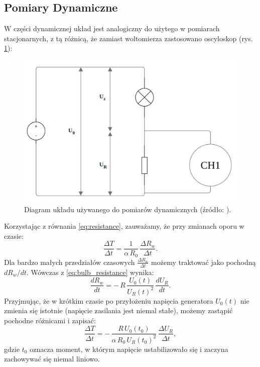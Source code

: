 \documentclass[12pt]{article}
\begin{document}
\newpage

\subsection{Pomiary Dynamiczne}
W części dynamicznej układ jest analogiczny do użytego w pomiarach stacjonarnych, z tą różnicą, że zamiast woltomierza zastosowano oscyloskop (rys. \ref{fig:pomiar_dyn}):
\begin{figure}[H]
    \centering
    \includegraphics[scale=0.25]{dynamic}
    \caption{Diagram układu używanego do pomiarów dynamicznych (źródło: \cite{diagram}).}
    \label{fig:pomiar_dyn}
\end{figure}

Korzystając z równania \eqref{eq:resistance}, zauważamy, że przy zmianach oporu w czasie:
\begin{equation}
    \frac{\Delta T}{\Delta t} = \frac{1}{\alpha\,R_0}\,\frac{\Delta R_w}{\Delta t}.
    \label{eq:temp_der}
\end{equation}
Dla bardzo małych przedziałów czasowych $\frac{\Delta R_w}{\Delta t}$ możemy traktować jako pochodną $d R_w / d t$. Wówczas z \eqref{eq:bulb_resistance} wynika:
\begin{equation}
    \frac{d R_w}{d t} = -\,R\,\frac{U_0(t)}{U_R(t)^2}\,\frac{d U_R}{dt}.
    \label{eq:bulb_der}
\end{equation}
Przyjmując, że w krótkim czasie po przyłożeniu napięcia generatora $U_0(t)$ nie zmienia się istotnie (napięcie zasilania jest niemal stałe), możemy zastąpić pochodne różnicami i zapisać:
\begin{equation}
    \frac{\Delta T}{\Delta t} = -\,\frac{R\,U_0(t_0)}{\alpha\,R_0\,U_R(t_0)^2}\,\frac{\Delta U_R}{\Delta t},
    \label{eq:temp_delta}
\end{equation}
gdzie $t_0$ oznacza moment, w którym napięcie ustabilizowało się i zaczyna zachowywać się niemal liniowo.
\end{document}
